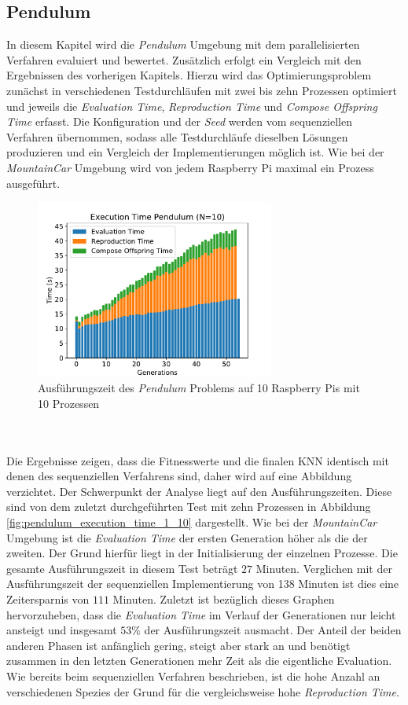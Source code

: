 \subsection{Pendulum}
In diesem Kapitel wird die \emph{Pendulum} Umgebung mit dem parallelisierten Verfahren evaluiert und bewertet. Zusätzlich erfolgt ein Vergleich mit den Ergebnissen des vorherigen Kapitels. Hierzu wird das Optimierungsproblem zunächst in verschiedenen Testdurchläufen mit zwei bis zehn Prozessen optimiert und jeweils die \emph{Evaluation Time}, \emph{Reproduction Time} und \emph{Compose Offspring Time} erfasst. Die Konfiguration und der \emph{Seed} werden vom sequenziellen Verfahren übernommen, sodass alle Testdurchläufe dieselben Lösungen produzieren und ein Vergleich der Implementierungen möglich ist. Wie bei der \emph{MountainCar} Umgebung wird von jedem Raspberry Pi maximal ein Prozess ausgeführt. 
\begin{figure}[!htb]
	\centering
	\includegraphics[width=0.7\textwidth]{./img/pendulum_analysis/pendulum_time_1_10core_10pi.pdf} 
	\caption{Ausführungszeit des \emph{Pendulum} Problems auf 10 Raspberry Pis mit 10 Prozessen}
	\label{fig:pendulum_time_10cores_10pi}
\end{figure}
\\\\
Die Ergebnisse zeigen, dass die Fitnesswerte und die finalen \ac{KNN} identisch mit denen des sequenziellen Verfahrens sind, daher wird auf eine Abbildung verzichtet. Der Schwerpunkt der Analyse liegt auf den Ausführungszeiten. Diese sind von dem zuletzt durchgeführten Test mit zehn Prozessen in Abbildung \ref{fig:pendulum_execution_time_1_10} dargestellt. Wie bei der \emph{MountainCar} Umgebung ist die \emph{Evaluation Time} der ersten Generation höher als die der zweiten. Der Grund hierfür liegt in der Initialisierung der einzelnen Prozesse. Die gesamte Ausführungszeit in diesem Test beträgt $27$ Minuten. Verglichen mit der Ausführungszeit der sequenziellen Implementierung von 138 Minuten ist dies eine Zeitersparnis von $111$ Minuten. Zuletzt ist bezüglich dieses Graphen hervorzuheben, dass die \emph{Evaluation Time} im Verlauf der Generationen nur leicht ansteigt und insgesamt $53\%$ der Ausführungszeit ausmacht. Der Anteil der beiden anderen Phasen ist anfänglich gering, steigt aber stark an und benötigt zusammen in den letzten Generationen mehr Zeit als die eigentliche Evaluation. Wie bereits beim sequenziellen Verfahren beschrieben, ist die hohe Anzahl an verschiedenen Spezies der Grund für die vergleichsweise hohe \emph{Reproduction Time}.
